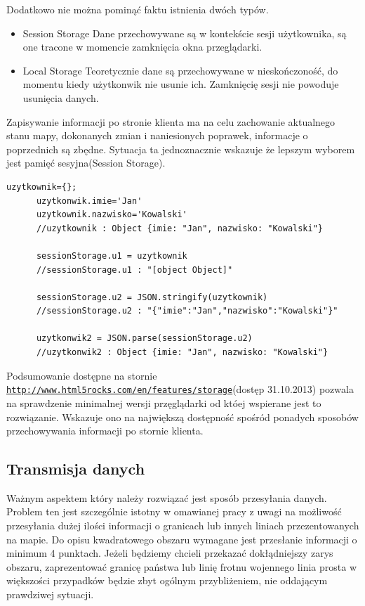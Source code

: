 Dodatkowo nie można pominąć faktu istnienia dwóch typów.
\begin{itemize}

\item
Session Storage
Dane przechowywane są w kontekście sesji użytkownika, są one tracone w momencie zamknięcia okna przeglądarki.

\item
Local Storage
Teoretycznie dane są przechowywane w nieskończoność, do momentu kiedy użytkonwik nie usunie ich. Zamknięcię sesji nie powoduje usunięcia danych.

\end{itemize}

Zapisywanie informacji po stronie klienta ma na celu zachowanie aktualnego stanu mapy, dokonanych zmian i naniesionych poprawek, informacje o poprzednich są zbędne. Sytuacja ta jednoznacznie wskazuje że lepszym wyborem jest pamięć sesyjna(Session Storage).

\lstset{language=JavaScript}
\label{lis:storage}
\begin{lstlisting}[caption=json]
      uzytkownik={};
      uzytkonwik.imie='Jan'
      uzytkownik.nazwisko='Kowalski'
      //uzytkownik : Object {imie: "Jan", nazwisko: "Kowalski"}

      sessionStorage.u1 = uzytkownik
      //sessionStorage.u1 : "[object Object]"

      sessionStorage.u2 = JSON.stringify(uzytkownik)
      //sessionStorage.u2 : "{"imie":"Jan","nazwisko":"Kowalski"}"

      uzytkonwik2 = JSON.parse(sessionStorage.u2)
      //uzytkonwik2 : Object {imie: "Jan", nazwisko: "Kowalski"}
\end{lstlisting}


Podsumowanie dostępne na stornie \underline{\texttt{http://www.html5rocks.com/en/features/storage}}(dostęp 31.10.2013) pozwala na sprawdzenie minimalnej wersji przęglądarki od któej wspierane jest to rozwiązanie. Wskazuje ono na największą dostępność spośród ponadych sposobów przechowywania informacji po stornie klienta.

\subsection{Transmisja danych}
\label{subsec:transmisjaDanych}

Ważnym aspektem który należy rozwiązać jest sposób przesyłania danych. Problem ten jest szczególnie istotny w omawianej pracy z uwagi na możliwość przesyłania dużej ilości informacji o granicach lub innych liniach przezentowanych na mapie. Do opisu kwadratowego obszaru wymagane jest przesłanie informacji o minimum 4 punktach. Jeżeli będziemy chcieli przekazać dokłądniejszy zarys obszaru, zaprezentować granicę państwa lub linię frotnu wojennego linia prosta w większości przypadków będzie zbyt ogólnym przybliżeniem, nie oddającym prawdziwej sytuacji.

